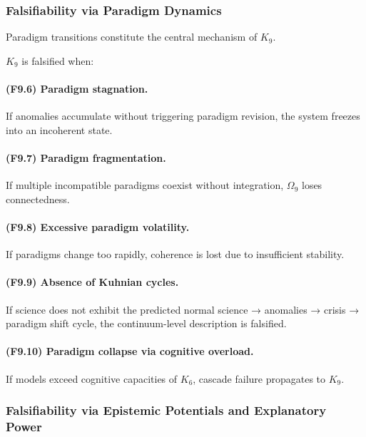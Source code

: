 \subsubsection{Falsifiability via Paradigm Dynamics}

Paradigm transitions constitute the central mechanism of $K_9$.

$K_9$ is falsified when:

\paragraph{(F9.6) Paradigm stagnation.}
If anomalies accumulate without triggering paradigm revision,
the system freezes into an incoherent state.

\paragraph{(F9.7) Paradigm fragmentation.}
If multiple incompatible paradigms coexist without integration,
$\Omega_9$ loses connectedness.

\paragraph{(F9.8) Excessive paradigm volatility.}
If paradigms change too rapidly,
coherence is lost due to insufficient stability.

\paragraph{(F9.9) Absence of Kuhnian cycles.}
If science does not exhibit the predicted
normal science → anomalies → crisis → paradigm shift cycle,
the continuum-level description is falsified.

\paragraph{(F9.10) Paradigm collapse via cognitive overload.}
If models exceed cognitive capacities of $K_6$,
cascade failure propagates to $K_9$.



\subsubsection{Falsifiability via Epistemic Potentials and Explanatory Power}

